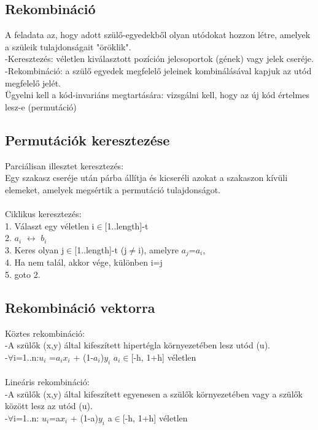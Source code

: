 \documentclass{article}
\begin{document}
	 \newpage
	 \subsection{Rekombináció}
	 A feladata az, hogy adott szülő-egyedekből olyan utódokat hozzon létre, amelyek a szüleik tulajdonságait "öröklik".\\
	 -Keresztezés: véletlen kiválasztott pozíción jelcsoportok (gének) vagy jelek cseréje.\\
	 -Rekombináció: a szülő egyedek megfelelő jeleinek kombinálásával kapjuk az utód megfelelő jelét.\\
	 Ügyelni kell a kód-invariáns megtartására: vizsgálni kell, hogy az új kód értelmes lesz-e (permutáció)
	 
	 \subsection{Permutációk keresztezése}
	 Parciálisan illesztet keresztezés:\\
	 Egy szakasz cseréje után párba állítja és kicseréli azokat a szakaszon kívüli elemeket, amelyek megsértik a permutáció tulajdonságot.\\ \\
	 Ciklikus keresztezés:\\
	 1. Választ egy véletlen i$\in$[1..length]-t\\
	 2. $a_i$ $\leftrightarrow$ $b_i$ \\
	 3. Keres olyan j$\in$[1..length]-t (j$\neq$i), amelyre $a_j$=$a_i$,\\
	 4. Ha nem talál, akkor vége, különben i=j\\
	 5. goto 2.\\
	 
	 \subsection{Rekombináció vektorra}
	 Köztes rekombináció: \\
	 -A szülők (x,y) által kifeszített hipertégla környezetében lesz utód (u).\\
	 -$\forall$i=1..n:$u_i$ =$a_i$$x_i$ + (1-$a_i$)$y_i$  $a_i$$\in$[-h, 1+h] véletlen\\ \\
	 Lineáris rekombináció: \\
	 -A szülők (x,y) által kifeszített egyenesen a szülők környezetében vagy a szülők között lesz az utód (u).\\
	 -$\forall$i=1..n: $u_i$=a$x_i$ + (1-a)$y_i$ a$\in$[-h, 1+h] véletlen\\
	 
\end{document}
